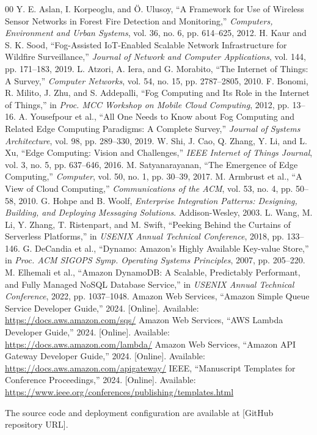 \documentclass[conference]{IEEEtran}
\begin{document}
\begin{thebibliography}{00}
 Y. E. Aslan, I. Korpeoglu, and \"O. Ulusoy, ``A Framework for Use of Wireless Sensor Networks in Forest Fire Detection and Monitoring,'' \emph{Computers, Environment and Urban Systems}, vol. 36, no. 6, pp. 614--625, 2012.
 H. Kaur and S. K. Sood, ``Fog-Assisted IoT-Enabled Scalable Network Infrastructure for Wildfire Surveillance,'' \emph{Journal of Network and Computer Applications}, vol. 144, pp. 171--183, 2019.
 L. Atzori, A. Iera, and G. Morabito, ``The Internet of Things: A Survey,'' \emph{Computer Networks}, vol. 54, no. 15, pp. 2787--2805, 2010.
 F. Bonomi, R. Milito, J. Zhu, and S. Addepalli, ``Fog Computing and Its Role in the Internet of Things,'' in \emph{Proc. MCC Workshop on Mobile Cloud Computing}, 2012, pp. 13--16.
 A. Yousefpour et al., ``All One Needs to Know about Fog Computing and Related Edge Computing Paradigms: A Complete Survey,'' \emph{Journal of Systems Architecture}, vol. 98, pp. 289--330, 2019.
 W. Shi, J. Cao, Q. Zhang, Y. Li, and L. Xu, ``Edge Computing: Vision and Challenges,'' \emph{IEEE Internet of Things Journal}, vol. 3, no. 5, pp. 637--646, 2016.
 M. Satyanarayanan, ``The Emergence of Edge Computing,'' \emph{Computer}, vol. 50, no. 1, pp. 30--39, 2017.
 M. Armbrust et al., ``A View of Cloud Computing,'' \emph{Communications of the ACM}, vol. 53, no. 4, pp. 50--58, 2010.
 G. Hohpe and B. Woolf, \emph{Enterprise Integration Patterns: Designing, Building, and Deploying Messaging Solutions}. Addison-Wesley, 2003.
 L. Wang, M. Li, Y. Zhang, T. Ristenpart, and M. Swift, ``Peeking Behind the Curtains of Serverless Platforms,'' in \emph{USENIX Annual Technical Conference}, 2018, pp. 133--146.
 G. DeCandia et al., ``Dynamo: Amazon's Highly Available Key-value Store,'' in \emph{Proc. ACM SIGOPS Symp. Operating Systems Principles}, 2007, pp. 205--220.
 M. Elhemali et al., ``Amazon DynamoDB: A Scalable, Predictably Performant, and Fully Managed NoSQL Database Service,'' in \emph{USENIX Annual Technical Conference}, 2022, pp. 1037--1048.
 Amazon Web Services, ``Amazon Simple Queue Service Developer Guide,'' 2024. [Online]. Available: \url{https://docs.aws.amazon.com/sqs/}
 Amazon Web Services, ``AWS Lambda Developer Guide,'' 2024. [Online]. Available: \url{https://docs.aws.amazon.com/lambda/}
 Amazon Web Services, ``Amazon API Gateway Developer Guide,'' 2024. [Online]. Available: \url{https://docs.aws.amazon.com/apigateway/}
 IEEE, ``Manuscript Templates for Conference Proceedings,'' 2024. [Online]. Available: \url{https://www.ieee.org/conferences/publishing/templates.html}
\end{thebibliography}

The source code and deployment configuration are available at [GitHub repository URL].
\end{document}
